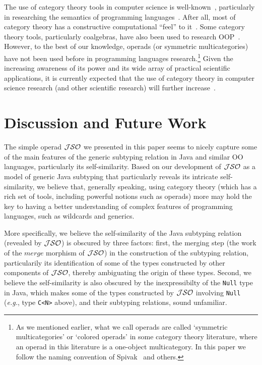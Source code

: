 \documentclass[twocolumn,english]{article}
\numberwithin{equation}{section}
\numberwithin{figure}{section}
\newcommand{\code}[1]{\texttt{#1}}
\begin{document}
The use of category theory tools in computer science is well-known~\cite{Pierce91,spivak2014category},
particularly in researching the semantics of programming languages~\cite{DTAL,Scott82,CatRecDomEqs82,GunterHandbook90,BauerCategory01,Gierz2003,DomTheoryIntro}.
After all, most of category theory has a constructive computational
``feel'' to it~\cite{Rydeheard1988,CatTheoryGentleIntro}. Some
category theory tools, particularly coalgebras, have also been used
to research OOP~\cite{CanningFbounded89,CookInheritance90,Jacobs95,Poll2000276}.
However, to the best of our knowledge, operads (or symmetric multicategories)~\cite{leinster2004higher}
have not been used before in programming languages research.\footnote{As we mentioned earlier, what we call operads are called `symmetric
multicategories' or `colored operads' in some category theory literature,
where an operad in this literature is a one-object multicategory.
In this paper we follow the naming convention of Spivak~\cite{spivak2014category}
and others.} Given the increasing awareness of its power and its wide array of
practical scientific applications, it is currently expected that the
use of category theory in computer science research (and other scientific
research) will further increase~\cite{lawvere2009conceptual,spivak2014category}.


\section{\label{sec:Conclusion-and-FW}Discussion and Future Work}

The simple operad $\mathcal{JSO}$ we presented in this paper seems to nicely
capture some of the main features of the generic subtyping relation
in Java and similar OO languages, particularly its self-similarity.
Based on our development of $\mathcal{JSO}$ as a model of generic Java subtyping
that particularly reveals its intricate self-similarity, we believe
that, generally speaking, using category theory (which has a rich
set of tools, including powerful notions such as operads) more may
hold the key to having a better understanding of complex features
of programming languages, such as wildcards and generics.

More specifically, we believe the self-similarity of the Java subtyping
relation (revealed by $\mathcal{JSO}$) is obscured by three factors: first,
the merging step (the work of the $merge$ morphism of $\mathcal{JSO}$) in
the construction of the subtyping relation, particularily its identification
of some of the types constructed by other components of $\mathcal{JSO}$, thereby
ambiguating the origin of these types. Second, we believe the self-similarity
is also obscured by the inexpressibilty of the \code{Null} type in
Java, which makes some of the types constructed by $\mathcal{JSO}$ involving
\code{Null} (\emph{e.g.}, type \code{C<N>} above), and their subtyping
relations, sound unfamiliar.
\end{document}

